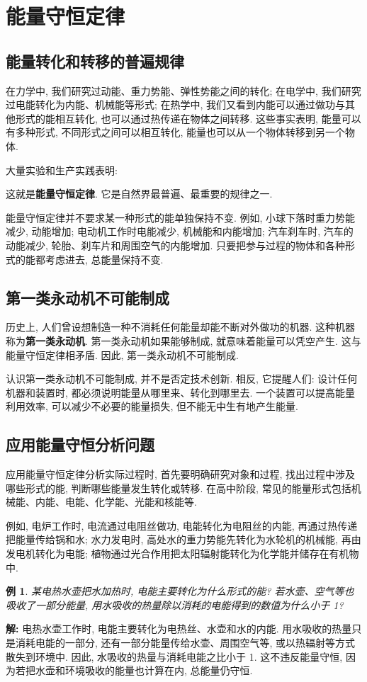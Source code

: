 \documentclass[UTF8,openany,fontset=fandol]{ctexbook}
\theoremstyle{chinesetextbook}
\newtheorem{example}{例}[chapter]
\newenvironment{solution}{\par\indent\textbf{解:} \ignorespaces}{\par}
\begin{document}
\section{能量守恒定律}
\subsection{能量转化和转移的普遍规律}
在力学中, 我们研究过动能、重力势能、弹性势能之间的转化; 在电学中, 我们研究过电能转化为内能、机械能等形式; 在热学中, 我们又看到内能可以通过做功与其他形式的能相互转化, 也可以通过热传递在物体之间转移. 这些事实表明, 能量可以有多种形式, 不同形式之间可以相互转化, 能量也可以从一个物体转移到另一个物体.

大量实验和生产实践表明:
\begin{center}
\end{center}

这就是\textbf{能量守恒定律}. 它是自然界最普遍、最重要的规律之一.

能量守恒定律并不要求某一种形式的能单独保持不变. 例如, 小球下落时重力势能减少, 动能增加; 电动机工作时电能减少, 机械能和内能增加; 汽车刹车时, 汽车的动能减少, 轮胎、刹车片和周围空气的内能增加. 只要把参与过程的物体和各种形式的能都考虑进去, 总能量保持不变.
\subsection{第一类永动机不可能制成}
历史上, 人们曾设想制造一种不消耗任何能量却能不断对外做功的机器. 这种机器称为\textbf{第一类永动机}. 第一类永动机如果能够制成, 就意味着能量可以凭空产生. 这与能量守恒定律相矛盾. 因此, 第一类永动机不可能制成.

认识第一类永动机不可能制成, 并不是否定技术创新. 相反, 它提醒人们: 设计任何机器和装置时, 都必须说明能量从哪里来、转化到哪里去. 一个装置可以提高能量利用效率, 可以减少不必要的能量损失, 但不能无中生有地产生能量.
\subsection{应用能量守恒分析问题}
应用能量守恒定律分析实际过程时, 首先要明确研究对象和过程, 找出过程中涉及哪些形式的能, 判断哪些能量发生转化或转移. 在高中阶段, 常见的能量形式包括机械能、内能、电能、化学能、光能和核能等.

例如, 电炉工作时, 电流通过电阻丝做功, 电能转化为电阻丝的内能, 再通过热传递把能量传给锅和水; 水力发电时, 高处水的重力势能先转化为水轮机的机械能, 再由发电机转化为电能; 植物通过光合作用把太阳辐射能转化为化学能并储存在有机物中.
\begin{example}
某电热水壶把水加热时, 电能主要转化为什么形式的能? 若水壶、空气等也吸收了一部分能量, 用水吸收的热量除以消耗的电能得到的数值为什么小于 1?
\end{example}
\begin{solution}
电热水壶工作时, 电能主要转化为电热丝、水壶和水的内能. 用水吸收的热量只是消耗电能的一部分, 还有一部分能量传给水壶、周围空气等, 或以热辐射等方式散失到环境中. 因此, 水吸收的热量与消耗电能之比小于 1. 这不违反能量守恒, 因为若把水壶和环境吸收的能量也计算在内, 总能量仍守恒.
\end{solution}
\end{document}
